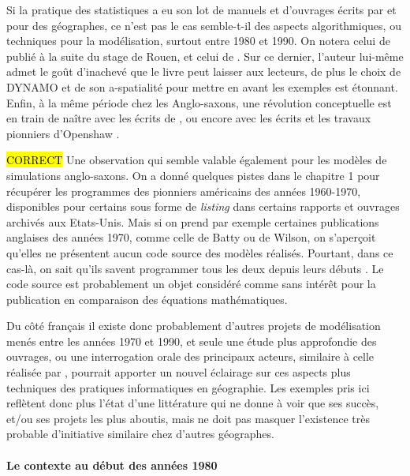 Si la pratique des statistiques a eu son lot de manuels et d'ouvrages écrits par et pour des géographes, ce n'est pas le cas semble-t-il des aspects algorithmiques, ou techniques pour la modélisation, surtout entre 1980 et 1990. On notera celui de \textcite{Guermond1984} publié à la suite du stage de Rouen, et celui de \textcite{Dauphine1987}. Sur ce dernier, l'auteur lui-même admet le goût d'inachevé que le livre peut laisser aux lecteurs, de plus le choix de DYNAMO et de son a-spatialité pour mettre en avant les exemples est étonnant. Enfin, à la même période chez les Anglo-saxons, une révolution conceptuelle est en train de naître avec les écrits de \textcite{Couclelis1985}, ou encore avec les écrits et les travaux pionniers d'Openshaw \autocites{Openshaw1983, Openshaw1988, Openshaw2000}.

\hl{CORRECT}
Une observation qui semble valable également pour les modèles de simulations anglo-saxons. On a donné quelques pistes dans le chapitre 1 pour récupérer les programmes des pionniers américains des années 1960-1970, disponibles pour certains sous forme de \textit{listing} dans certains rapports et ouvrages archivés aux Etats-Unis. Mais si on prend par exemple certaines publications anglaises des années 1970, comme celle de Batty \autocite{Batty1976} ou de Wilson, on s'aperçoit qu'elles ne présentent aucun code source des modèles réalisés. Pourtant, dans ce cas-là, on sait qu'ils savent programmer tous les deux depuis leurs débuts \autocites{Batty1971b, Batty2014} . Le code source est probablement un objet considéré comme sans intérêt  pour la publication en comparaison des équations mathématiques.

Du côté français il existe donc probablement d'autres projets de modélisation menés entre les années 1970 et 1990, et seule une étude plus approfondie des ouvrages, ou une interrogation orale des principaux acteurs, similaire à celle réalisée par \textcite{Cuyala2014}, pourrait apporter un nouvel éclairage sur ces aspects plus techniques des pratiques informatiques en géographie. Les exemples pris ici reflètent donc plus l'état d'une littérature qui ne donne à voir que ses succès, et/ou ses projets les plus aboutis, mais ne doit pas masquer l'existence très probable d'initiative similaire chez d'autres géographes.

\paragraph{Le contexte au début des années 1980}

